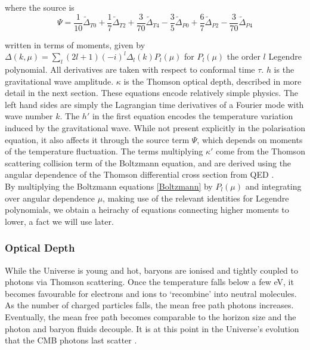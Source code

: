 \documentclass[a4paper,10pt]{article}
\begin{document}
where the source is
\begin{equation}
\Psi = \frac{1}{10}\tilde{\Delta}_{T0} + \frac{1}{7}\tilde{\Delta}_{T2} + \frac{3}{70}\tilde{\Delta}_{T4} - \frac{3}{5}\tilde{\Delta}_{P0} + \frac{6}{7}\tilde{\Delta}_{P2} - \frac{3}{70}\tilde{\Delta}_{P4}
\end{equation}

written in terms of moments, given by $\Delta(k, \mu) = \sum_l (2l+1)(-i)^l\Delta_l(k)P_l(\mu)$ for $P_l(\mu)$ the order $l$ Legendre polynomial. All derivatives are taken with respect to conformal time $\tau$. $h$ is the gravitational wave amplitude. $\kappa$ is the Thomson optical depth, described in more detail in the next section. These equations encode relatively simple physics. The left hand sides are simply the Lagrangian time derivatives of a Fourier mode with wave number $k$. The $h'$ in the first equation encodes the temperature variation induced by the gravitational wave. While not present explicitly in the polarisation equation, it also affects it through the source term $\Psi$, which depends on moments of the temperature fluctuation. The terms multiplying $\kappa'$ come from the Thomson scattering collision term of the Boltzmann equation, and are derived using the angular dependence of the Thomson differential cross section from QED \cite{QBM, kowosky}. \\

By multiplying the Boltzmann equations \ref{Boltzmann} by $P_l(\mu)$ and integrating over angular dependence $\mu$, making use of the relevant identities for Legendre polynomials, we obtain a heirachy of equations connecting higher moments to lower, a fact we will use later.

\subsubsection{Optical Depth}

While the Universe is young and hot, baryons are ionised and tightly coupled to photons via Thomson scattering. Once the temperature falls below a few eV, it becomes favourable for electrons and ions to `recombine' into neutral molecules. As the number of charged particles falls, the mean free path photons increases. Eventually, the mean free path becomes comparable to the horizon size and the photon and baryon fluids decouple. It is at this point in the Universe’s evolution that the CMB photons last scatter \cite{Pritchard}.\\
\end{document}

